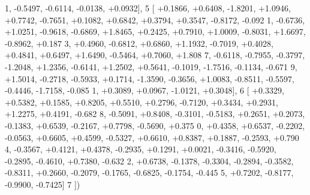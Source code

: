 \begin{DoxyCode}
      1, -0.5497, -0.6114, -0.0138, +0.0932],
5 [ +0.1866, +0.6408, -1.8201, +1.0946, +0.7742, -0.7651, +0.1082, +0.6842, +0.3794, +0.3547, -0.8172, -0.092
      1, -0.6736, +1.0251, -0.9618, -0.6869, +1.8465, +0.2425, +0.7910, +1.0009, -0.8031, +1.6697, -0.8962, +0.187
      3, +0.4960, -0.6812, +0.6860, +1.1932, -0.7019, +0.4028, +0.4841, +0.6497, +1.6490, -0.5464, +0.7060, +1.808
      7, -0.6118, -0.7955, -0.3797, -1.2048, +1.2356, -0.6141, +1.2502, +0.5641, -0.1019, -1.7516, -0.1134, -0.671
      9, +1.5014, -0.2718, -0.5933, +0.1714, -1.3590, -0.3656, +1.0083, -0.8511, -0.5597, -0.4446, -1.7158, -0.085
      1, +0.3089, +0.0967, -1.0121, +0.3048],
6 [ +0.3329, +0.5382, +0.1585, +0.8205, +0.5510, +0.2796, -0.7120, +0.3434, +0.2931, +1.2275, +0.4191, -0.682
      8, -0.5091, +0.8408, -0.3101, -0.5183, +0.2651, +0.2073, -0.1383, +0.6539, -0.2167, +0.7798, -0.5690, +0.375
      0, +0.4358, +0.6537, -0.2202, -0.0563, +0.6605, +0.4599, -0.5327, +0.6610, +0.8387, +0.1887, -0.2593, +0.790
      4, -0.3567, +0.4121, +0.4378, -0.2935, +0.1291, +0.0021, -0.3416, -0.5920, -0.2895, -0.4610, +0.7380, -0.632
      2, +0.6738, -0.1378, -0.3304, -0.2894, -0.3582, -0.8311, +0.2660, -0.2079, -0.1765, -0.6825, -0.1754, -0.445
      5, +0.7202, -0.8177, -0.9900, -0.7425]
7 ])
\end{DoxyCode}
